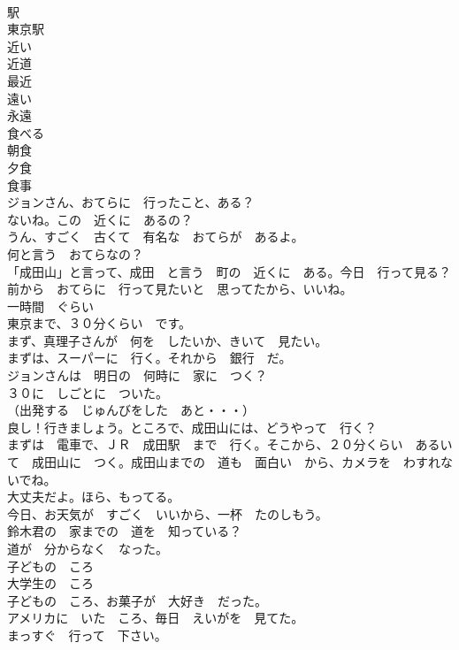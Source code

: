 \documentclass[8pt]{extreport}
\begin{document}
\begin{CJK}{UTF8}{min}
\\	駅	
\\	東京駅	
\\	近い	
\\	近道	
\\	最近	
\\	遠い	
\\	永遠	
\\	食べる	
\\	朝食	
\\	夕食	
\\	食事	
\\	ジョンさん、おてらに　行ったこと、ある？	
\\	ないね。この　近くに　あるの？	
\\	うん、すごく　古くて　有名な　おてらが　あるよ。	
\\	何と言う　おてらなの？	
\\	「成田山」と言って、成田　と言う　町の　近くに　ある。今日　行って見る？	
\\	前から　おてらに　行って見たいと　思ってたから、いいね。	
\\	一時間　ぐらい	
\\	東京まで、３０分くらい　です。	
\\	まず、真理子さんが　何を　したいか、きいて　見たい。	
\\	まずは、スーパーに　行く。それから　銀行　だ。	
\\	ジョンさんは　明日の　何時に　家に　つく？	
\\	３０に　しごとに　ついた。	
\\	（出発する　じゅんびをした　あと・・・）	
\\	良し！行きましょう。ところで、成田山には、どうやって　行く？	
\\	まずは　電車で、ＪＲ　成田駅　まで　行く。そこから、２０分くらい　あるいて　成田山に　つく。成田山までの　道も　面白い　から、カメラを　わすれないでね。	
\\	大丈夫だよ。ほら、もってる。	
\\	今日、お天気が　すごく　いいから、一杯　たのしもう。	
\\	鈴木君の　家までの　道を　知っている？	
\\	道が　分からなく　なった。	
\\	子どもの　ころ	
\\	大学生の　ころ	
\\	子どもの　ころ、お菓子が　大好き　だった。	
\\	アメリカに　いた　ころ、毎日　えいがを　見てた。	
\\	まっすぐ　行って　下さい。	

\end{CJK}
\end{document}
